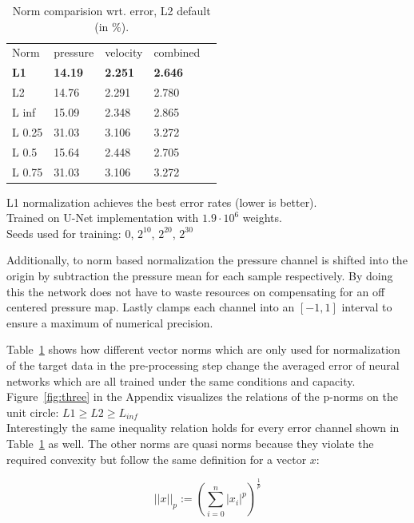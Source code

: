 \documentclass[acmtog]{techreportacmart}
\begin{document}
\begin{table}
\caption{Norm comparision wrt. error, L2 default (in \%).}
\label{tab:one}
\begin{center}
\begin{tabular}{l|l|l|l|l}
  \toprule
  Norm   & pressure   &	velocity    & combined \\
  \bf L1	 & \bf 14.19	  & \bf 2.251		& \bf 2.646    \\
  L2	 & 14.76	  & 2.291		& 2.780	   \\
  L inf	 & 15.09	  & 2.348		& 2.865	   \\
  L 0.25 & 31.03	  & 3.106		& 3.272	   \\
  L 0.5  & 15.64	  & 2.448		& 2.705	   \\
  L 0.75 & 31.03	  & 3.106		& 3.272	   \\	
  \bottomrule
\end{tabular}
\end{center}
\bigskip\centering
\footnotesize L1 normalization achieves the best error rates (lower is better). \\
Trained on \cite{Thuerey20} U-Net implementation with $1.9 \cdot 10^{6}$ weights. \\
Seeds used for training: $0$, $2^{10}$, $2^{20}$, $2^{30}$
\end{table}%
Additionally, to norm based normalization the pressure channel is shifted into the origin 
by subtraction the pressure mean for each sample respectively. By doing this the network 
does not have to waste resources on compensating for an off centered pressure map. Lastly 
\cite{Thuerey20} clamps each channel into an $[-1, 1]$ interval to ensure a maximum of numerical precision.


Table~\ref{tab:one} shows how different vector norms which are only used for normalization 
of the target data in the pre-processing step change the averaged error of neural networks 
which are all trained under the same conditions and capacity. Figure~\ref{fig:three} in the 
Appendix visualizes the relations of the p-norms on the unit circle: $L1 \geq L2 \geq L_{inf}$\\
Interestingly the same inequality relation holds for every error channel shown in Table~\ref{tab:one} 
as well. The other norms are quasi norms because they violate the required convexity 
but follow the same definition for a vector $x$:

\begin{equation}
\label{eqn:01}
||x||_p := {\left( \sum_{i=0}^{n} |x_i|^p \right)}^{\frac{1}{p}}
\end{equation}
\end{document}
